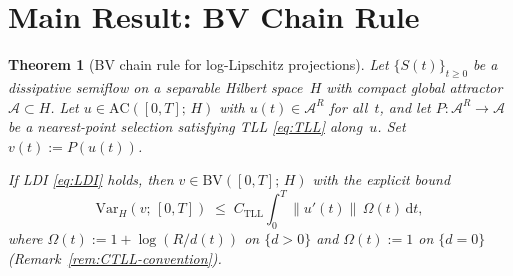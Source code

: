 \documentclass[12pt,a4paper]{article}
\theoremstyle{definition}
\theoremstyle{plain}
\newtheorem{theorem}[definition]{Theorem}
\theoremstyle{remark}
\newcommand{\Var}{\mathrm{Var}}
\newcommand{\AC}{\mathrm{AC}}
\newcommand{\BV}{\mathrm{BV}}
\begin{document}
\section{Main Result: BV Chain Rule}
\label{sec:main}

\begin{theorem}[BV chain rule for log-Lipschitz projections]
\label{thm:BV-chain}
Let $\{S(t)\}_{t \ge 0}$ be a dissipative semiflow on a separable
Hilbert space~$H$ with compact global attractor
$\mathcal{A} \subset H$.  Let $u \in \AC([0,T];\, H)$ with
$u(t) \in \mathcal{A}^R$ for all~$t$, and let
$P: \mathcal{A}^R \to \mathcal{A}$ be a nearest-point selection
satisfying TLL \eqref{eq:TLL} along~$u$.  Set $v(t) := P(u(t))$.

If LDI \eqref{eq:LDI} holds, then
$v \in \BV([0,T];\, H)$ with the explicit bound
\begin{equation}\label{eq:BV-bound}
  \Var_H(v;\,[0,T])
  \;\le\;
  C_{\mathrm{TLL}}
  \int_0^T \|u'(t)\|\,\Omega(t)\,\mathrm{d}t,
\end{equation}
where $\Omega(t) := 1 + \log(R/d(t))$ on $\{d > 0\}$ and
$\Omega(t) := 1$ on $\{d = 0\}$
(Remark~\ref{rem:CTLL-convention}).
\end{theorem}
\end{document}
